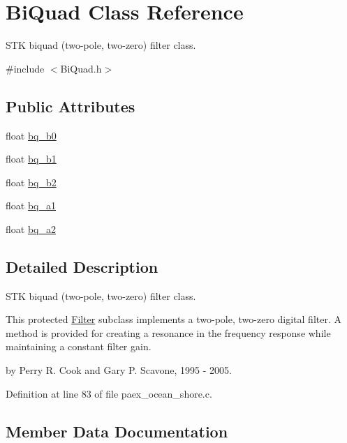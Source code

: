 \hypertarget{struct_bi_quad}{}\section{Bi\+Quad Class Reference}
\label{struct_bi_quad}


S\+TK biquad (two-\/pole, two-\/zero) filter class.  




{\ttfamily \#include $<$Bi\+Quad.\+h$>$}

\subsection*{Public Attributes}
\begin{DoxyCompactItemize}
\item 
float \hyperlink{struct_bi_quad_a733b09def873b098d577620155c26a4d}{bq\+\_\+b0}
\item 
float \hyperlink{struct_bi_quad_ab7889f23cfa53a67288bd7391e3631f4}{bq\+\_\+b1}
\item 
float \hyperlink{struct_bi_quad_a1a7098ce9c1167023fb886b2500a29fd}{bq\+\_\+b2}
\item 
float \hyperlink{struct_bi_quad_afc64d4491bf95b1aafaf036a3a1ec544}{bq\+\_\+a1}
\item 
float \hyperlink{struct_bi_quad_a44ed6f441b25d98880fce5ba33f56432}{bq\+\_\+a2}
\end{DoxyCompactItemize}


\subsection{Detailed Description}
S\+TK biquad (two-\/pole, two-\/zero) filter class. 

This protected \hyperlink{class_filter}{Filter} subclass implements a two-\/pole, two-\/zero digital filter. A method is provided for creating a resonance in the frequency response while maintaining a constant filter gain.

by Perry R. Cook and Gary P. Scavone, 1995 -\/ 2005. 

Definition at line 83 of file paex\+\_\+ocean\+\_\+shore.\+c.



\subsection{Member Data Documentation}
